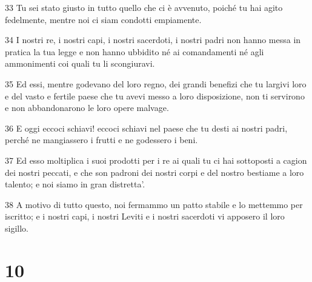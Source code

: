 \par 33 Tu sei stato giusto in tutto quello che ci è avvenuto, poiché tu hai agito fedelmente, mentre noi ci siam condotti empiamente.
\par 34 I nostri re, i nostri capi, i nostri sacerdoti, i nostri padri non hanno messa in pratica la tua legge e non hanno ubbidito né ai comandamenti né agli ammonimenti coi quali tu li scongiuravi.
\par 35 Ed essi, mentre godevano del loro regno, dei grandi benefizi che tu largivi loro e del vasto e fertile paese che tu avevi messo a loro disposizione, non ti servirono e non abbandonarono le loro opere malvage.
\par 36 E oggi eccoci schiavi! eccoci schiavi nel paese che tu desti ai nostri padri, perché ne mangiassero i frutti e ne godessero i beni.
\par 37 Ed esso moltiplica i suoi prodotti per i re ai quali tu ci hai sottoposti a cagion dei nostri peccati, e che son padroni dei nostri corpi e del nostro bestiame a loro talento; e noi siamo in gran distretta'.
\par 38 A motivo di tutto questo, noi fermammo un patto stabile e lo mettemmo per iscritto; e i nostri capi, i nostri Leviti e i nostri sacerdoti vi apposero il loro sigillo.

\chapter{10}

